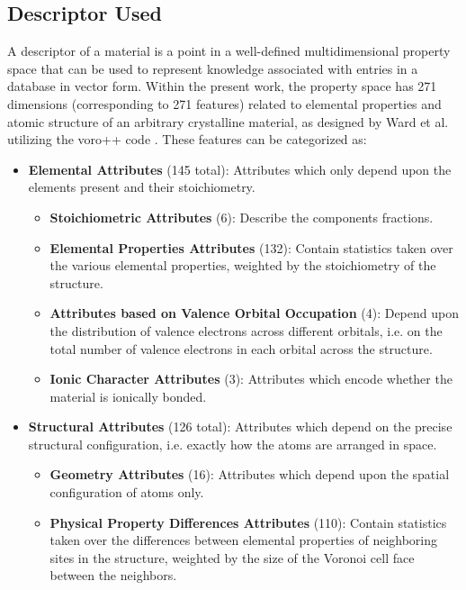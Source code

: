 \subsection{Descriptor Used} \label{sipfenn:ssec:descriptorused}
A descriptor of a material is a point in a well-defined multidimensional property space that can be used to represent knowledge associated with entries in a database in vector form. Within the present work, the property space has 271 dimensions (corresponding to 271 features) related to elemental properties and atomic structure of an arbitrary crystalline material, as designed by Ward et al. \cite{Ward2016AMaterials, Ward2017IncludingTessellations} utilizing the voro++ code \cite{rycroft2009voro++}. These features can be categorized as:

\begin{itemize}
    \item \textbf{Elemental Attributes} (145 total): Attributes which only depend upon the elements present and their stoichiometry.
    \begin{itemize}
        \item \textbf{Stoichiometric Attributes} (6): Describe the components fractions.
        \item \textbf{Elemental Properties Attributes} (132): Contain statistics taken over the various elemental properties, weighted by the stoichiometry of the structure.
        \item \textbf{Attributes based on Valence Orbital Occupation} (4): Depend upon the distribution of valence electrons across different orbitals, i.e. on the total number of valence electrons in each orbital across the structure.
        \item \textbf{Ionic Character Attributes} (3): Attributes which encode whether the material is ionically bonded. 
    \end{itemize}
    \item \textbf{Structural Attributes} (126 total): Attributes which depend on the precise structural configuration, i.e. exactly how the atoms are arranged in space.
    \begin{itemize}
        \item \textbf{Geometry Attributes} (16): Attributes which depend upon the spatial configuration of atoms only.
        \item \textbf{Physical Property Differences Attributes} (110): Contain statistics taken over the differences between elemental properties of neighboring sites in the structure, weighted by the size of the Voronoi cell face between the neighbors.
    \end{itemize}
\end{itemize}


